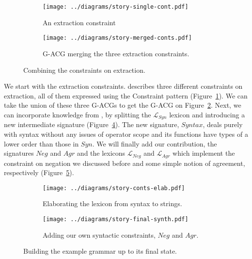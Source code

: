 \documentclass{llncs}
\begin{document}
\begin{figure}[t]
  \centering
  \begin{subfigure}[b]{0.4\textwidth}
    \centering
    \texttt{[image: ../diagrams/story-single-cont.pdf]}
    \caption{\label{fig:single-cont} An extraction constraint }
  \end{subfigure}
  \qquad
  \begin{subfigure}[b]{0.4\textwidth}
    \centering
    \texttt{[image: ../diagrams/story-merged-conts.pdf]}
    \caption{\label{fig:merged-conts} G-ACG merging the three extraction
      constraints.}
  \end{subfigure}
  \caption{\label{fig:conts} Combining the constraints on extraction.}
\end{figure}

We start with the extraction constraints. \cite{pogodalla2012controlling}
describes three different constraints on extraction, all of them expressed
using the Constraint pattern (Figure~\ref{fig:single-cont}). We can take the
union of these three G-ACGs to get the G-ACG on Figure~\ref{fig:merged-conts}.
Next, we can incorporate knowledge from \cite{pogodalla2007generalizing}, by
splitting the $\mathcal{L}_{Syn}$ lexicon and introducing a new intermediate
signature (Figure~\ref{fig:conts-elab}). The new signature, $Syntax$, deals
purely with syntax without any issues of operator scope and its functions have
types of a lower order than those in $Syn$. We will finally add our
contribution, the signatures $Neg$ and $Agr$ and the lexicons
$\mathcal{L}_{Neg}$ and $\mathcal{L}_{Agr}$ which implement the constraint on
negation we discussed before and some simple notion of agreement, respectively
(Figure~\ref{fig:final-synth}).

\begin{figure}[t]
  \centering
  \begin{subfigure}[b]{0.4\textwidth}
    \centering
    \texttt{[image: ../diagrams/story-conts-elab.pdf]}
    \caption{\label{fig:conts-elab} Elaborating the lexicon from syntax to
      strings. }
  \end{subfigure}
  \qquad
  \begin{subfigure}[b]{0.4\textwidth}
    \centering
    \texttt{[image: ../diagrams/story-final-synth.pdf]}
    \caption{\label{fig:final-synth} Adding our own syntactic constraints,
      $Neg$ and $Agr$.}
  \end{subfigure}
  \caption{\label{fig:final} Building the example grammar up to its final
    state.}
\end{figure}
\end{document}
